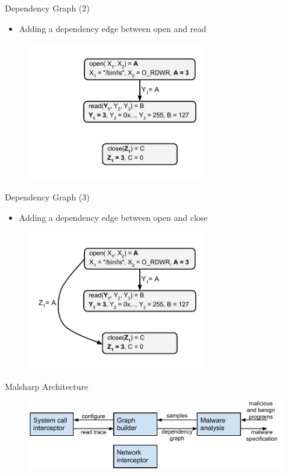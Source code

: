 \documentclass{beamer}
\begin{document}
\begin{frame}{Dependency Graph (2)}
  \begin{itemize}
    \item Adding a dependency edge between open and read
  \end{itemize}
  \begin{figure}[p]
    \includegraphics[width=3in]{img/syscall-dep-graph-1.pdf}
    \end{figure}
\end{frame}

\begin{frame}{Dependency Graph (3)}
  \begin{itemize}
    \item Adding a dependency edge between open and close
  \end{itemize}
  \begin{figure}[p]
    \includegraphics[width=3in]{img/syscall-dep-graph-2.pdf}
    \end{figure}
\end{frame}

\begin{frame}[t]{Malsharp Architecture}
  \begin{figure}[p]
    \includegraphics[width=4.4in]{img/mal-sharp-architecture.pdf}
    \end{figure}
\end{frame}
\end{document}
